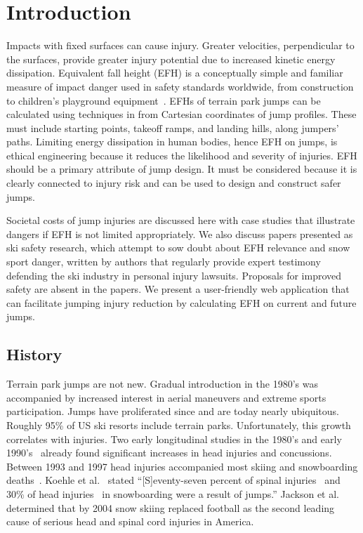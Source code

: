 \documentclass[smallextended]{svjour3}       %
\begin{document}
\section{Introduction}
\label{intro}
%
Impacts with fixed surfaces can cause injury. Greater velocities, perpendicular
to the surfaces, provide greater injury potential due to increased kinetic
energy dissipation. Equivalent fall height (EFH) is a conceptually simple and
familiar measure of impact danger used in safety standards worldwide, from
construction~\cite{OSHA2021} to children's playground
equipment~\cite{Chalmers1996}. EFHs of terrain park jumps can be calculated
using techniques in \cite{Levy2015} from Cartesian coordinates of jump
profiles. These must include starting points, takeoff ramps, and landing hills,
along jumpers' paths. Limiting energy dissipation in human bodies, hence EFH on
jumps, is ethical engineering because it reduces the likelihood and severity of
injuries. EFH should be a primary attribute of jump design. It must be
considered because it is clearly connected to injury risk and can be used to
design and construct safer jumps.

Societal costs of jump injuries are discussed here with case studies that
illustrate dangers if EFH is not limited appropriately. We also discuss papers
presented as ski safety research, which attempt to sow doubt about EFH
relevance and snow sport danger, written by authors that regularly provide
expert testimony defending the ski industry in personal injury lawsuits.
Proposals for improved safety are absent in the papers. We present a
user-friendly web application that can facilitate jumping injury reduction by
calculating EFH on current and future jumps.

\subsection{History}
\label{sec:hist}
%
Terrain park jumps are not new. Gradual introduction in the 1980's was
accompanied by increased interest in aerial maneuvers and extreme sports
participation. Jumps have proliferated since and are today nearly ubiquitous.
Roughly 95\% of US ski resorts include terrain parks. Unfortunately, this
growth correlates with injuries. Two early longitudinal studies in the 1980's
and early 1990's~\cite{Deibert1998,Furrer1995} already found significant
increases in head injuries and concussions. Between 1993 and 1997 head injuries
accompanied most skiing and snowboarding deaths~\cite{CPSC1999}. Koehle et
al.~\cite{Koehle2002} stated ``[S]eventy-seven percent of spinal
injuries~\cite{Tarazi1999} and 30\% of head injuries~\cite{Fukuda2001} in
snowboarding were a result of jumps.'' Jackson et al.~\cite{Jackson2004}
determined that by 2004 snow skiing replaced football as the second leading
cause of serious head and spinal cord injuries in America.
\end{document}

